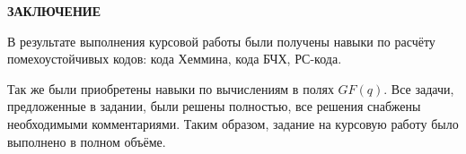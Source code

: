 \newpage
\begin{center}
  \Large{\textbf{ЗАКЛЮЧЕНИЕ}}
\end{center}

В результате выполнения курсовой работы были получены навыки по расчёту
помехоустойчивых кодов: кода Хеммина, кода БЧХ, РС-кода.

Так же были приобретены навыки по вычислениям в полях $GF(q)$.  Все
задачи, предложенные в задании, были решены полностью, все решения
снабжены необходимыми комментариями. Таким образом, задание на
курсовую работу было выполнено в полном объёме.  \newpage

